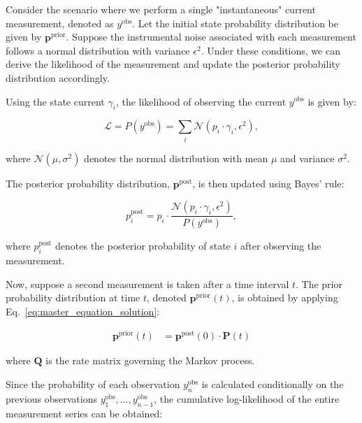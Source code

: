 \documentclass[pdflatex,sn-mathphys-num]{sn-jnl}%
\theoremstyle{thmstyleone}%
\theoremstyle{thmstyletwo}%
\theoremstyle{thmstylethree}%
\begin{document}
Consider the scenario where we perform a single "instantaneous" current measurement, denoted as \( y^{\text{obs}} \). Let the initial state probability distribution be given by \( \boldsymbol{p}^{\text{prior}} \). Suppose the instrumental noise associated with each measurement follows a normal distribution with variance \( \epsilon^2 \). Under these conditions, we can derive the likelihood of the measurement and update the posterior probability distribution accordingly.

Using the state current $\gamma_i$, the likelihood of observing the current \( y^{\text{obs}} \) is given by:

\begin{equation}
	\mathcal{L} = P(y^{\text{obs}}) = \sum_i \mathcal{N}(p_i \cdot \gamma_i, \epsilon^2),
	\label{eq:single_channel_likelihood}
\end{equation}

where \( \mathcal{N}(\mu, \sigma^2) \) denotes the normal distribution with mean \( \mu \) and variance \( \sigma^2 \).

The posterior probability distribution, \( \boldsymbol{p}^{\text{post}} \), is then updated using Bayes' rule:

\begin{equation}
	p^{\text{post}}_i = p_i \cdot \frac{\mathcal{N}(p_i \cdot \gamma_i, \epsilon^2)}{P(y^{\text{obs}})},
	\label{eq:single_channel_posterior}
\end{equation}

where \( p^{\text{post}}_i \) denotes the posterior probability of state \( i \) after observing the measurement.

Now, suppose a second measurement is taken after a time interval \( t \). The prior probability distribution at time \( t \), denoted \( \boldsymbol{p}^{\text{prior}}(t) \), is obtained by applying Eq.~\ref{eq:master_equation_solution}:

\begin{align}
	\boldsymbol{p}^{\text{prior}}(t) &= \boldsymbol{p}^{\text{post}}(0) \cdot \boldsymbol{P}(t)
	\label{eq:prior_update}
\end{align}

where \( \boldsymbol{Q} \) is the rate matrix governing the Markov process.

Since the probability of each observation \( {y}_n^{\text{obs}} \) is calculated conditionally on the previous observations \( {y}_1^{\text{obs}}, \dots, {y}_{n-1}^{\text{obs}} \), the cumulative log-likelihood of the entire measurement series can be obtained:
\end{document}
